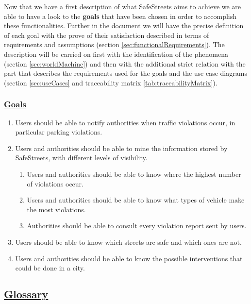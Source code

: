 	 Now that we have a first description of what SafeStreets aims to achieve we are able to have a look to the \textbf{goals} that have been chosen in order to accomplish these functionalities. Further in the document we will have the precise definition of each goal with the prove of their satisfaction described in terms of requirements and assumptions (section \ref{sec:functionalRequirements}). The description will be carried on first with the identification of the phenomena (section \ref{sec:worldMachine}) and then with the additional strict relation with the part that describes the requirements used for the goals and the use case diagrams (section \ref{sec:useCases} and traceability matrix \ref{tab:traceabilityMatrix}). 
	
	\subsubsection[Goals]{\hyperlink{toc}{Goals}}
		\label{sec:goals}
		\begin{enumerate}[label=\textbf{G\arabic*}]
			\item \label{goal:notification} Users should be able to notify authorities when traffic violations occur, in particular parking violations.
			\item \label{goal:mining} Users and authorities should be able to mine the information stored by SafeStreets, with different levels of visibility.
				\begin{enumerate}[label=\textbf{G2\Alph*}]
					\item \label{goal:miningA} Users and authorities should be able to know where the highest number of violations occur.
					\item \label{goal:miningB} Users and authorities should be able to know what types of vehicle make the most violations.
					\item \label{goal:miningC} Authorities should be able to consult every violation report sent by users.
				\end{enumerate}
			\item \label{goal:safety} Users should be able to know which streets are safe and which ones are not.
			\item \label{goal:intervention} Users and authorities should be able to know the possible interventions that could be done in a city.
		\end{enumerate}
	
\subsection[Glossary]{\hyperlink{toc}{Glossary}}
	\label{sec:glossary}
	
